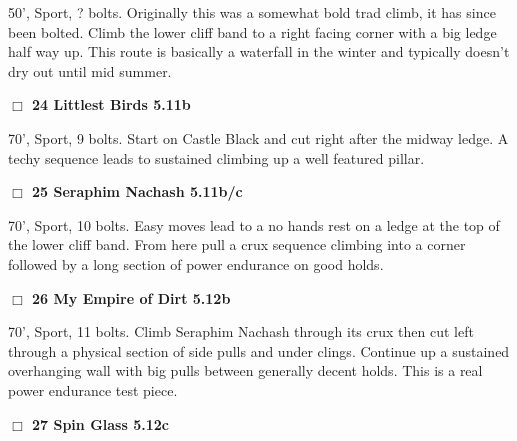 \begin{multicols}{2}
\begin{adjustwidth}{1.3em}{}
50', Sport, ? bolts. Originally this was a somewhat bold trad climb, it has since been bolted. Climb the lower cliff band to a right facing corner with a big ledge half way up. This route is basically a waterfall in the winter and typically doesn't dry out until mid summer.
\end{adjustwidth}




\needspace{2em}
\label{rt:Littlest Birds}
\colorbox{RoyalBlue!20}{
\parbox{0.95\linewidth}{
\hspace{-1ex}\textbf{$\Box$
24 Littlest Birds 5.11b  
}}}
\begin{adjustwidth}{1.3em}{}			

70', Sport, 9 bolts. Start on Castle Black and cut right after the midway ledge. A techy sequence leads to sustained climbing up a well featured pillar.
\end{adjustwidth}




\needspace{2em}
\label{rt:Seraphim Nachash}
\colorbox{RoyalBlue!20}{
\parbox{0.95\linewidth}{
\hspace{-1ex}\textbf{$\Box$
25 Seraphim Nachash 5.11b/c  
}}}
\begin{adjustwidth}{1.3em}{}			

70', Sport, 10 bolts. Easy moves lead to a no hands rest on a ledge at the top of the lower cliff band. From here pull a crux sequence climbing into a corner followed by a long section of power endurance on good holds.
\end{adjustwidth}




\needspace{2em}
\label{rt:My Empire of Dirt}
\colorbox{Goldenrod!20}{
\parbox{0.95\linewidth}{
\hspace{-1ex}\textbf{$\Box$
26 My Empire of Dirt 5.12b  
}}}
\begin{adjustwidth}{1.3em}{}			

70', Sport, 11 bolts. Climb Seraphim Nachash through its crux then cut left through a physical section of side pulls and under clings. Continue up a sustained overhanging wall with big pulls between generally decent holds. This is a real power endurance test piece.
\end{adjustwidth}




\needspace{2em}
\label{rt:Spin Glass}
\colorbox{Goldenrod!20}{
\parbox{0.95\linewidth}{
\hspace{-1ex}\textbf{$\Box$
27 Spin Glass 5.12c  
}}}
\begin{adjustwidth}{1.3em}{}			


\end{adjustwidth}
\end{multicols}
